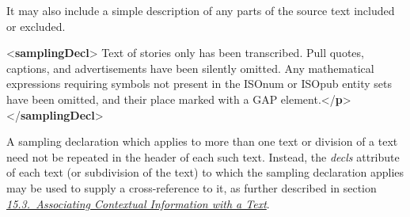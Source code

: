 It may also include a simple description of any parts of the source text included or excluded. \par\bgroup{}\exampleFont \begin{shaded}\noindent\mbox{}{<\textbf{samplingDecl}>}\mbox{}\newline 
{}Text of stories only has been transcribed. Pull quotes, captions,\mbox{}\newline 
\hspace*{1em}\hspace*{1em} and advertisements have been silently omitted. Any mathematical\mbox{}\newline 
\hspace*{1em}\hspace*{1em} expressions requiring symbols not present in the ISOnum or ISOpub\mbox{}\newline 
\hspace*{1em}\hspace*{1em} entity sets have been omitted, and their place marked with a GAP\mbox{}\newline 
\hspace*{1em}\hspace*{1em} element.{</\textbf{p}>}\mbox{}\newline 
{</\textbf{samplingDecl}>}\end{shaded}\egroup\par \par
A sampling declaration which applies to more than one text or division of a text need not be repeated in the header of each such text. Instead, the {\itshape decls} attribute of each text (or subdivision of the text) to which the sampling declaration applies may be used to supply a cross-reference to it, as further described in section \textit{\hyperref[CCAS]{15.3.\ Associating Contextual Information with a Text}}.

